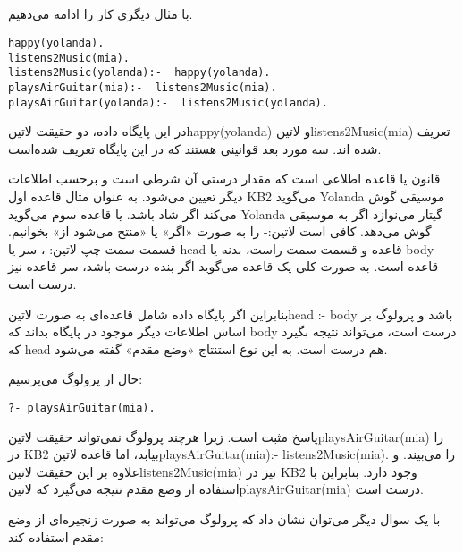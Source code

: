 \subsection{}
با مثال دیگری کار را ادامه می‌دهیم.

\begin{latin}
\begin{lstlisting}[title=KB2]
happy(yolanda). 
listens2Music(mia). 
listens2Music(yolanda):-  happy(yolanda). 
playsAirGuitar(mia):-  listens2Music(mia). 
playsAirGuitar(yolanda):-  listens2Music(yolanda).
\end{lstlisting}
\end{latin}

در این پایگاه داده، دو حقیقت ‌لاتین{happy(yolanda)} و ‌لاتین{listens2Music(mia)} تعریف شده اند. سه مورد بعد قوانینی هستند که در این پایگاه تعریف شده‌است.

قانون یا قاعده اطلاعی است که مقدار درستی آن شرطی است و برحسب اطلاعات دیگر تعیین می‌شود. به عنوان مثال قاعده اول KB2 می‌گوید Yolanda موسیقی گوش می‌کند اگر شاد باشد. یا قاعده سوم می‌گوید Yolanda گیتار می‌نوازد اگر به موسیقی گوش می‌دهد. کافی است ‌لاتین{:-} را به صورت «اگر» یا «منتج می‌شود از» بخوانیم. قسمت سمت چپ ‌لاتین{:-}، سر یا head قاعده و قسمت سمت راست، بدنه یا body قاعده است. به صورت کلی یک قاعده می‌گوید اگر بنده درست باشد، سر قاعده نیز درست است.

بنابراین اگر پایگاه داده شامل قاعده‌ای به صورت ‌لاتین{head :- body} باشد و پرولوگ بر اساس اطلاعات دیگر موجود در پایگاه بداند که body درست است، می‌تواند نتیجه بگیرد که head هم درست است. به این نوع استنتاج «وضع مقدم» گفته می‌شود.

حال از پرولوگ می‌پرسیم:

\begin{latin}
\begin{lstlisting}
?- playsAirGuitar(mia).
\end{lstlisting}
\end{latin}

پاسخ مثبت است. زیرا هرچند پرولوگ نمی‌تواند حقیقت ‌لاتین{playsAirGuitar(mia)} را در KB2 بیابد، اما قاعده ‌لاتین{playsAirGuitar(mia):-  listens2Music(mia).} را می‌بیند. و علاوه بر این حقیقت ‌لاتین{listens2Music(mia)} نیز در KB2 وجود دارد. بنابراین با استفاده از وضع مقدم نتیجه می‌گیرد که ‌لاتین{playsAirGuitar(mia)} درست است.

با یک سوال دیگر می‌توان نشان داد که پرولوگ می‌تواند به صورت زنجیره‌ای از وضع مقدم استفاده کند:

